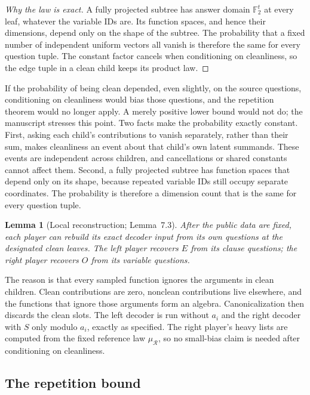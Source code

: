 \documentclass[11pt]{article}
\newtheorem{lemma}[theorem]{Lemma}
\theoremstyle{definition}
\theoremstyle{remark}
\newcommand{\Fb}{\mathbb F_2}
\begin{document}
\begin{proof}[Why the law is exact]
A fully projected subtree has answer domain $\Fb^t$ at every leaf, whatever
the variable IDs are. Its function spaces, and hence their dimensions, depend
only on the shape of the subtree. The probability that a fixed number of
independent uniform vectors all vanish is therefore the same for every
question tuple. The constant factor cancels when conditioning on cleanliness,
so the edge tuple in a clean child keeps its product law.
\end{proof}

\begin{idea}
If the probability of being clean depended, even slightly, on the source
questions, conditioning on cleanliness would bias those questions, and the
repetition theorem would no longer apply. A merely positive lower bound would
not do; the manuscript stresses this point. Two facts make the probability
exactly constant. First, asking each child's contributions to vanish
separately, rather than their sum, makes cleanliness an event about that
child's own latent summands. These events are independent across children,
and cancellations or shared constants cannot affect them. Second, a fully
projected subtree has function spaces that depend only on its shape, because
repeated variable IDs still occupy separate coordinates. The probability is
therefore a dimension count that is the same for every question tuple.
\end{idea}

\begin{lemma}[Local reconstruction; Lemma~7.3]
After the public data are fixed, each player can rebuild its exact decoder
input from its own questions at the designated clean leaves. The left player
recovers $E$ from its clause questions; the right player recovers $O$ from
its variable questions.
\end{lemma}

The reason is that every sampled function ignores the arguments in clean
children. Clean contributions are zero, nonclean contributions live
elsewhere, and the functions that ignore those arguments form an algebra.
Canonicalization then discards the clean slots. The left decoder is run
without $a_i$ and the right decoder with $S$ only modulo $a_i$, exactly as
specified. The right player's heavy lists are computed from the fixed
reference law $\mu_{\mathcal R}$, so no small-bias claim is needed after
conditioning on cleanliness.

\subsection{The repetition bound}
\end{document}
